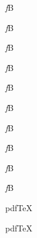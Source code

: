 \documentclass{article}
\begin{document}
\begin{example}
{\em f}B
\end{example}

\begin{example}
{\em f}\/B
\end{example}

\begin{example}
{\it f}B
\end{example}

\begin{example}
{\it f}\/B
\end{example}

\begin{example}
{\sl f}B
\end{example}

\begin{example}
{\sl f}\/B
\end{example}

\begin{example}
{\itshape f}B
\end{example}

\begin{example}
{\itshape f}\/B
\end{example}

\begin{example}
{\slshape f}B
\end{example}

\begin{example}
{\slshape f}\/B
\end{example}


\begin{example}
pdf\TeX
\end{example}

\begin{example}
pdf\/\TeX
\end{example}
\end{document}
